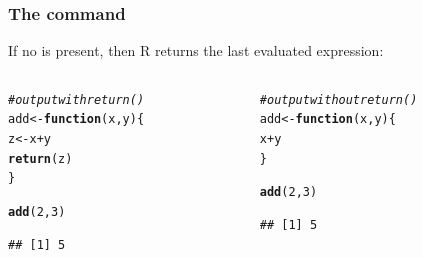 \documentclass[12pt]{beamer}\usepackage[]{graphicx}\usepackage[]{color}
\makeatletter
\newcommand{\hlnum}[1]{\textcolor[rgb]{0.686,0.059,0.569}{#1}}%
\newcommand{\hlcom}[1]{\textcolor[rgb]{0.678,0.584,0.686}{\textit{#1}}}%
\newcommand{\hlopt}[1]{\textcolor[rgb]{0,0,0}{#1}}%
\newcommand{\hlstd}[1]{\textcolor[rgb]{0.345,0.345,0.345}{#1}}%
\newcommand{\hlkwa}[1]{\textcolor[rgb]{0.161,0.373,0.58}{\textbf{#1}}}%
\newcommand{\hlkwb}[1]{\textcolor[rgb]{0.69,0.353,0.396}{#1}}%
\newcommand{\hlkwc}[1]{\textcolor[rgb]{0.333,0.667,0.333}{#1}}%
\newcommand{\hlkwd}[1]{\textcolor[rgb]{0.737,0.353,0.396}{\textbf{#1}}}%
\newenvironment{kframe}{%
 \def\at@end@of@kframe{}%
 \ifinner\ifhmode%
  \def\at@end@of@kframe{\end{minipage}}%
  \begin{minipage}{\columnwidth}%
 \fi\fi%
 \def\FrameCommand##1{\hskip\@totalleftmargin \hskip-\fboxsep
 \colorbox{shadecolor}{##1}\hskip-\fboxsep
     \hskip-\linewidth \hskip-\@totalleftmargin \hskip\columnwidth}%
 \MakeFramed {\advance\hsize-\width
   \@totalleftmargin\z@ \linewidth\hsize
   \@setminipage}}%
 {\par\unskip\endMakeFramed%
 \at@end@of@kframe}
\newenvironment{knitrout}{}{} %
\makeatother
\begin{document}

\begin{frame}[fragile]
\frametitle{The  command}

If no  is present, then R returns the last evaluated expression:

\begin{columns}[t]
\begin{column}{0.45\textwidth}

\begin{knitrout}\footnotesize
{}\color{fgcolor}\begin{kframe}
\begin{alltt}
\hlcom{# output with return()}
\hlstd{add} \hlkwb{<-} \hlkwa{function}\hlstd{(}\hlkwc{x}\hlstd{,} \hlkwc{y}\hlstd{) \{}
  \hlstd{z} \hlkwb{<-} \hlstd{x} \hlopt{+} \hlstd{y}
  \hlkwd{return}\hlstd{(z)}
\hlstd{\}}

\hlkwd{add}\hlstd{(}\hlnum{2}\hlstd{,} \hlnum{3}\hlstd{)}
\end{alltt}
\begin{verbatim}
## [1] 5
\end{verbatim}
\end{kframe}
\end{knitrout}
\end{column}

\begin{column}{0.45\textwidth}
\begin{knitrout}\footnotesize
{}\color{fgcolor}\begin{kframe}
\begin{alltt}
\hlcom{# output without return()}
\hlstd{add} \hlkwb{<-} \hlkwa{function}\hlstd{(}\hlkwc{x}\hlstd{,} \hlkwc{y}\hlstd{) \{}
  \hlstd{x} \hlopt{+} \hlstd{y}
\hlstd{\}}

\hlkwd{add}\hlstd{(}\hlnum{2}\hlstd{,} \hlnum{3}\hlstd{)}
\end{alltt}
\begin{verbatim}
## [1] 5
\end{verbatim}
\end{kframe}
\end{knitrout}
\end{column}
\end{columns}

\end{frame}

\end{document}
